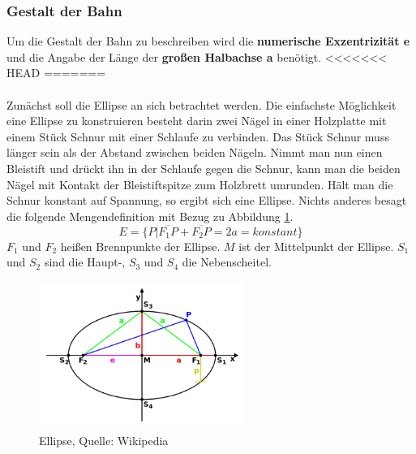 \subsubsection*{Gestalt der Bahn}
Um die Gestalt der Bahn zu beschreiben wird die \textbf{numerische Exzentrizität e} und die Angabe der Länge der \textbf{großen Halbachse a} benötigt.
<<<<<<< HEAD
=======
\\\\Zunächst soll die Ellipse an sich betrachtet werden. Die einfachste Möglichkeit eine Ellipse zu konstruieren besteht darin zwei Nägel in einer Holzplatte mit einem Stück Schnur mit einer Schlaufe zu verbinden. Das Stück Schnur muss länger sein als der Abstand zwischen beiden Nägeln. Nimmt man nun einen Bleistift und drückt ihn in der Schlaufe gegen die Schnur, kann man die beiden Nägel mit Kontakt der Bleistiftspitze zum Holzbrett umrunden. Hält man die Schnur konstant auf Spannung, so ergibt sich eine Ellipse. Nichts anderes besagt die folgende Mengendefinition mit Bezug zu Abbildung \ref{fig:ellipse}. 
\begin{equation}
E = \{P | \overline{F_{1}P} + \overline{F_{2}P} = 2a = konstant\}
\end{equation}
\ensuremath{F_{1}} und \ensuremath{F_{2}} heißen Brennpunkte der Ellipse. \ensuremath{M} ist der Mittelpunkt der Ellipse. \ensuremath{S_{1}} und \ensuremath{S_{2}} sind die Haupt-, \ensuremath{S_{3}} und \ensuremath{S_{4}} die Nebenscheitel.      
\begin{figure}[!htbp]                                                                       %
	\centering                                                                            	%
	\includegraphics[width=0.6\textwidth]{./images/ellipse.png}                             %
	\caption[Ellipse]{Ellipse, Quelle: Wikipedia}                                           %
	\label{fig:ellipse}                                                                     %
\end{figure}                                                                              	%
